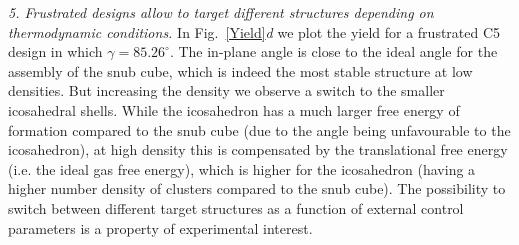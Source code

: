 \documentclass[a4paper, amsfonts, amssymb, amsmath, reprint, showkeys, nofootinbib, oneside]{revtex4-1}
\begin{document}

\noindent
\emph{5. Frustrated designs allow to target different structures depending on thermodynamic conditions.} In Fig.~\ref{Yield}\textit{d}  we plot the yield for a frustrated C5 design in which $\gamma=85.26^\circ$. The in-plane angle is close to the ideal angle for the assembly of the snub cube, which is indeed the most stable structure at low densities. But increasing the density we observe a switch to the smaller icosahedral shells. While the icosahedron has a much larger free energy of formation compared to the snub cube (due to the angle being unfavourable to the icosahedron), at high density this is compensated by the translational free energy (i.e. the ideal gas free energy), which is higher for the icosahedron (having a higher number density of clusters compared to the snub cube). The possibility to switch between different target structures as a function of external control parameters is a property of experimental interest.
\end{document}
